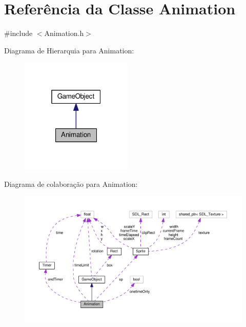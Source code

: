 \hypertarget{classAnimation}{\section{Referência da Classe Animation}
\label{classAnimation}
}


{\ttfamily \#include $<$Animation.\+h$>$}



Diagrama de Hierarquia para Animation\+:\nopagebreak
\begin{figure}[H]
\begin{center}
\leavevmode
\includegraphics[width=151pt]{classAnimation__inherit__graph}
\end{center}
\end{figure}


Diagrama de colaboração para Animation\+:\nopagebreak
\begin{figure}[H]
\begin{center}
\leavevmode
\includegraphics[width=350pt]{classAnimation__coll__graph}
\end{center}
\end{figure}

